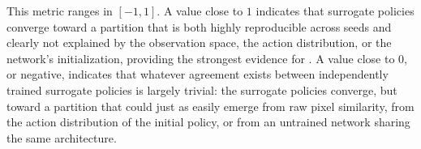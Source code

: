 This metric ranges in $[-1, 1]$.
A value close to $1$ indicates that surrogate policies converge toward a partition that is both highly reproducible across seeds and clearly not explained by the observation space, the action distribution, or the network's initialization, providing the strongest evidence for \RepresentationConvergenceHypothesisName.
A value close to $0$, or negative, indicates that whatever agreement exists between independently trained surrogate policies is largely trivial: the surrogate policies converge, but toward a partition that could just as easily emerge from raw pixel similarity, from the action distribution of the initial policy, or from an untrained network sharing the same architecture.

